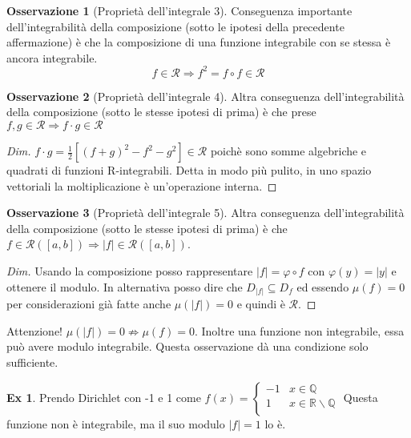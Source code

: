 \documentclass{article}
\theoremstyle{definition}
\theoremstyle{definition}
\theoremstyle{definition}
\theoremstyle{definition}
\newtheorem{remark}{Osservazione}[section]
\theoremstyle{definition}
\newtheorem{example}{Ex}[section]
\theoremstyle{definition}
\begin{document}
\begin{remark}[Proprietà dell'integrale 3]
    Conseguenza importante dell'integrabilità della composizione (sotto le ipotesi della precedente affermazione) è che la composizione di una funzione integrabile con se stessa è ancora integrabile.
    \[
        f\in\mathcal{R} \Rightarrow f^2=f\circ f\in\mathcal{R}
    \]
\end{remark}

\begin{remark}[Proprietà dell'integrale 4]
    Altra conseguenza dell'integrabilità della composizione (sotto le stesse ipotesi di prima) è che prese $f,g \in \mathcal{R} \Rightarrow f\cdot g \in \mathcal{R}$
    \begin{proof}[Dim]
        $f\cdot g = \frac{1}{2}[(f+g)^2-f^2-g^2] \in \mathcal{R}$ poichè sono somme algebriche e quadrati di funzioni R-integrabili. Detta in modo più pulito, in uno spazio vettoriali la moltiplicazione è un'operazione interna.
    \end{proof}
\end{remark}

\begin{remark}[Proprietà dell'integrale 5]
    Altra conseguenza dell'integrabilità della composizione (sotto le stesse ipotesi di prima) è che $f\in\mathcal{R}([a,b])\Rightarrow |f|\in \mathcal{R}([a,b])$.
    \begin{proof}[Dim]
        Usando la composizione posso rappresentare $|f|=\varphi \circ f$ con $\varphi(y)=|y|$ e ottenere il modulo. In alternativa posso dire che $D_{|f|}\subseteq D_f$ ed essendo $\mu(f)=0$ per considerazioni già fatte anche $\mu(|f|)=0$ e quindi è $\mathcal{R}$.
        \end{proof}
        Attenzione! $\mu(|f|)=0 \nRightarrow \mu(f)=0$. Inoltre una funzione non integrabile, essa può avere modulo integrabile. Questa osservazione dà una condizione solo sufficiente.
\end{remark}

\begin{example}
    Prendo Dirichlet con -1 e 1 come $f(x)=\begin{cases}
        -1 & x\in\mathbb{Q} \\
        1 & x\in\mathbb{R}\backslash\mathbb{Q}\\
    \end{cases}$
    Questa funzione non è integrabile, ma il suo modulo $|f|=1$ lo è.
\end{example}
\end{document}
